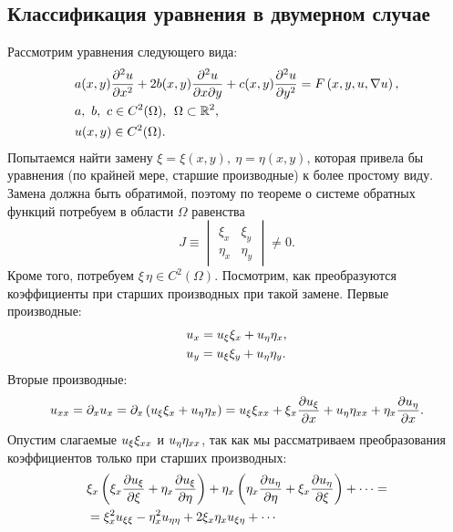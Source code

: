 \subsection{Классификация уравнения в двумерном случае}
    Рассмотрим уравнения следующего вида:
    \begin{align}
        & a(x, y)\frac{\partial^2u}{\partial{x}^2} + 2b(x,y)\frac{\partial^2u}{\partial x\partial y} + c(x, y)\frac{\partial^2u}{\partial{y}^2} = F\left({x, y, u, \nabla u}\right), \label{lin2} \\
        & a,\ b,\ c \in  C^2(\Omega), \:\: \Omega \subset \mathbb{R}^2, \notag \\
        & u(x,y) \in C^2(\Omega). \notag
    \end{align}
    Попытаемся найти замену $\xi = \xi(x, y),\ \eta = \eta(x, y)$, которая привела бы уравнения (по крайней мере, старшие производные) к более простому виду.
    Замена должна быть обратимой, поэтому по теореме о системе обратных функций потребуем в области $\Omega$ равенства
    \begin{equation*}
        J \equiv \begin{vmatrix}
            \xi_x & \xi_y \\
            \eta_x & \eta_y
        \end{vmatrix}
        \not= 0.
    \end{equation*}
    Кроме того, потребуем $\xi\, \eta \in C^2(\Omega)$. Посмотрим, как преобразуются коэффициенты при старших производных при
    такой замене. Первые производные:
    \begin{align*}
        & u_x = u_{\xi}\xi_x + u_{\eta} \eta_x,\\
        & u_y = u_{\xi}\xi_y + u_{\eta} \eta_y.
    \end{align*}
    Вторые производные:
    \begin{equation*}
        u_{xx} = \partial_x u_x = \partial_x\left({u_{\xi}\xi_x + u_{\eta} \eta_x}\right) = u_{\xi} \xi_{xx} + \xi_x\frac{\partial u_{\xi}}{\partial x} + 
        u_{\eta} \eta_{xx} + \eta_x \frac{\partial u_{\eta}}{\partial x}.
    \end{equation*}
    Опустим слагаемые $ u_{\xi} \xi_{xx} $ и $ u_{\eta} \eta_{xx} $, так как мы рассматриваем преобразования коэффициентов только при старших
    производных:
    \begin{align*}
        & \xi_x\left({\xi_x \frac{\partial u_{\xi}}{\partial\xi} + \eta_x \frac{\partial u_{\xi}}{\partial\eta}}\right) + \eta_x\left({\eta_x\frac{\partial u_{\eta}}{\partial\eta} + \xi_x \frac{\partial u_{\eta}}{\partial\xi}}\right) + \cdots = \\
        & = \xi_x^2 u_{\xi\xi} - \eta_x^2u_{\eta\eta} + 2\xi_x\eta_x u_{\xi\eta} + \cdots
    \end{align*}
